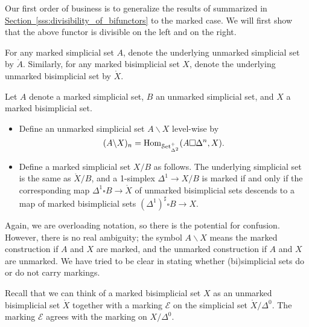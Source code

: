 \documentclass[main.tex]{subfiles}
\begin{document}
Our first order of business is to generalize the results of \cite{qcats_vs_segal_spaces} summarized in \hyperref[sss:divisibility_of_bifunctors]{Section~\ref*{sss:divisibility_of_bifunctors}} to the marked case. We will first show that the above functor is divisible on the left and on the right.

\begin{notation}
  For any marked simplicial set $A$, denote the underlying unmarked simplicial set by $\mathring{A}$. Similarly, for any marked bisimplicial set $X$, denote the underlying unmarked bisimplicial set by $\mathring{X}$.
\end{notation}

\begin{definition}
  Let $A$ denote a marked simplicial set, $B$ an unmarked simplicial set, and $X$ a marked bisimplicial set.
  \begin{itemize}
    \item Define an unmarked simplicial set $A \backslash X$ level-wise by
      \begin{equation*}
        (A \backslash X)_{n} = \mathrm{Hom}_{\mathcal{S}\mathrm{et}_{\Delta^{2}}^{+}}(A \square \Delta^{n}, X).
      \end{equation*}

    \item Define a marked simplicial set $X / B$ as follows. The underlying simplicial set is the same as $\mathring{X} / B$, and a 1-simplex $\Delta^{1} \to X / B$ is marked if and only if the corresponding map $\Delta^{1} \square B \to \mathring{X}$ of unmarked bisimplicial sets descends to a map of marked bisimplicial sets $(\Delta^{1})^{\sharp} \square B \to X$.
  \end{itemize}
\end{definition}

Again, we are overloading notation, so there is the potential for confusion. However, there is no real ambiguity; the symbol $A \backslash X$ means the marked construction if $A$ and $X$ are marked, and the unmarked construction if $A$ and $X$ are unmarked. We have tried to be clear in stating whether (bi)simplicial sets do or do not carry markings.

\begin{example}
  Recall that we can think of a marked bisimplicial set $X$ as an unmarked bisimplicial set $\mathring{X}$ together with a marking $\mathcal{E}$ on the simplicial set $\mathring{X} / \Delta^{0}$. The marking $\mathcal{E}$ agrees with the marking on $X / \Delta^{0}$.
\end{example}
\end{document}
